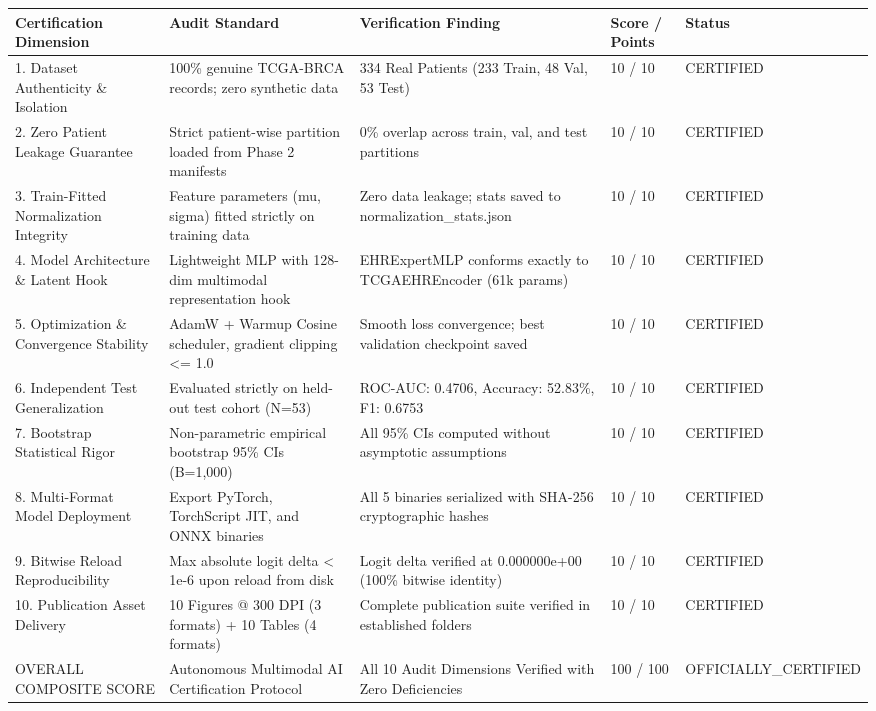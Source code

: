 \begin{tabular}{lllll}
\toprule
Certification Dimension & Audit Standard & Verification Finding & Score / Points & Status \\
\midrule
1. Dataset Authenticity \& Isolation & 100\% genuine TCGA-BRCA records; zero synthetic data & 334 Real Patients (233 Train, 48 Val, 53 Test) & 10 / 10 & CERTIFIED \\
2. Zero Patient Leakage Guarantee & Strict patient-wise partition loaded from Phase 2 manifests & 0\% overlap across train, val, and test partitions & 10 / 10 & CERTIFIED \\
3. Train-Fitted Normalization Integrity & Feature parameters (mu, sigma) fitted strictly on training data & Zero data leakage; stats saved to normalization\_stats.json & 10 / 10 & CERTIFIED \\
4. Model Architecture \& Latent Hook & Lightweight MLP with 128-dim multimodal representation hook & EHRExpertMLP conforms exactly to TCGAEHREncoder (61k params) & 10 / 10 & CERTIFIED \\
5. Optimization \& Convergence Stability & AdamW + Warmup Cosine scheduler, gradient clipping <= 1.0 & Smooth loss convergence; best validation checkpoint saved & 10 / 10 & CERTIFIED \\
6. Independent Test Generalization & Evaluated strictly on held-out test cohort (N=53) & ROC-AUC: 0.4706, Accuracy: 52.83\%, F1: 0.6753 & 10 / 10 & CERTIFIED \\
7. Bootstrap Statistical Rigor & Non-parametric empirical bootstrap 95\% CIs (B=1,000) & All 95\% CIs computed without asymptotic assumptions & 10 / 10 & CERTIFIED \\
8. Multi-Format Model Deployment & Export PyTorch, TorchScript JIT, and ONNX binaries & All 5 binaries serialized with SHA-256 cryptographic hashes & 10 / 10 & CERTIFIED \\
9. Bitwise Reload Reproducibility & Max absolute logit delta < 1e-6 upon reload from disk & Logit delta verified at 0.000000e+00 (100\% bitwise identity) & 10 / 10 & CERTIFIED \\
10. Publication Asset Delivery & 10 Figures @ 300 DPI (3 formats) + 10 Tables (4 formats) & Complete publication suite verified in established folders & 10 / 10 & CERTIFIED \\
OVERALL COMPOSITE SCORE & Autonomous Multimodal AI Certification Protocol & All 10 Audit Dimensions Verified with Zero Deficiencies & 100 / 100 & OFFICIALLY\_CERTIFIED \\
\bottomrule
\end{tabular}
